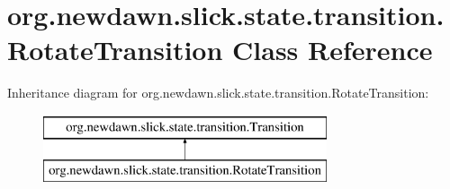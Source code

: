 \hypertarget{classorg_1_1newdawn_1_1slick_1_1state_1_1transition_1_1_rotate_transition}{}\section{org.\+newdawn.\+slick.\+state.\+transition.\+Rotate\+Transition Class Reference}
\label{classorg_1_1newdawn_1_1slick_1_1state_1_1transition_1_1_rotate_transition}
Inheritance diagram for org.\+newdawn.\+slick.\+state.\+transition.\+Rotate\+Transition\+:\begin{figure}[H]
\begin{center}
\leavevmode
\includegraphics[height=2.000000cm]{classorg_1_1newdawn_1_1slick_1_1state_1_1transition_1_1_rotate_transition}
\end{center}
\end{figure}
